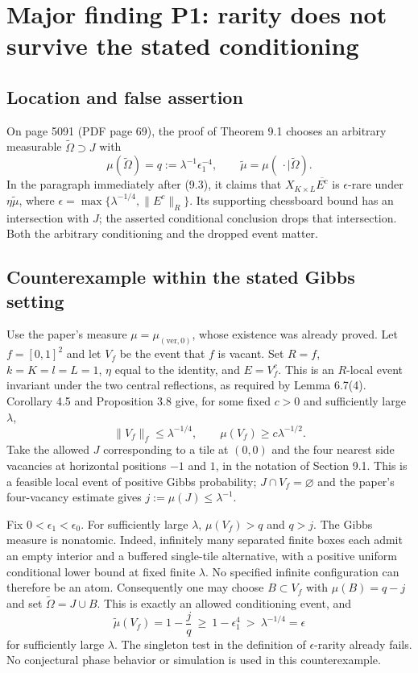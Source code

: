 \documentclass[10pt]{article}
\begin{document}
\section*{Major finding P1: rarity does not survive the stated conditioning}
\subsection*{Location and false assertion}
On page 5091 (PDF page 69), the proof of Theorem 9.1 chooses an arbitrary measurable \(\widetilde\Omega\supset J\) with \[\mu(\widetilde\Omega)=q:=\lambda^{-1}\epsilon_1^{-4},
 \qquad \widetilde\mu=\mu(\,\cdot\mid\widetilde\Omega).\] In the paragraph immediately after (9.3), it claims that \(X_{K\times L}\overline{E^c}\) is \(\epsilon\)-rare under \(\eta\widetilde\mu\), where \(\epsilon=\max\{\lambda^{-1/4},\|E^c\|_R\}\). Its supporting chessboard bound has an intersection with \(J\); the asserted conditional conclusion drops that intersection. Both the arbitrary conditioning and the dropped event matter.\par
\subsection*{Counterexample within the stated Gibbs setting}
Use the paper’s measure \(\mu=\mu_{(\mathrm{ver},0)}\), whose existence was already proved. Let \(f=[0,1]^2\) and let \(V_f\) be the event that \(f\) is vacant. Set \(R=f\), \(k=K=l=L=1\), \(\eta\) equal to the identity, and \(E=V_f^c\). This is an \(R\)-local event invariant under the two central reflections, as required by Lemma 6.7(4). Corollary 4.5 and Proposition 3.8 give, for some fixed \(c>0\) and sufficiently large \(\lambda\), \[\|V_f\|_f\leq\lambda^{-1/4},
 \qquad \mu(V_f)\geq c\lambda^{-1/2}.\] Take the allowed \(J\) corresponding to a tile at \((0,0)\) and the four nearest side vacancies at horizontal positions \(-1\) and \(1\), in the notation of Section 9.1. This is a feasible local event of positive Gibbs probability; \(J\cap V_f=\varnothing\) and the paper’s four-vacancy estimate gives \(j:=\mu(J)\leq\lambda^{-1}\).\par
Fix \(0<\epsilon_1<\epsilon_0\). For sufficiently large \(\lambda\), \(\mu(V_f)>q\) and \(q>j\). The Gibbs measure is nonatomic. Indeed, infinitely many separated finite boxes each admit an empty interior and a buffered single-tile alternative, with a positive uniform conditional lower bound at fixed finite \(\lambda\). No specified infinite configuration can therefore be an atom. Consequently one may choose \(B\subset V_f\) with \(\mu(B)=q-j\) and set \(\widetilde\Omega=J\cup B\). This is exactly an allowed conditioning event, and \[\widetilde\mu(V_f)=1-\frac{j}{q}
 \ \geq\ 1-\epsilon_1^4
 \ >\ \lambda^{-1/4}=\epsilon\] for sufficiently large \(\lambda\). The singleton test in the definition of \(\epsilon\)-rarity already fails. No conjectural phase behavior or simulation is used in this counterexample.\par
\end{document}
